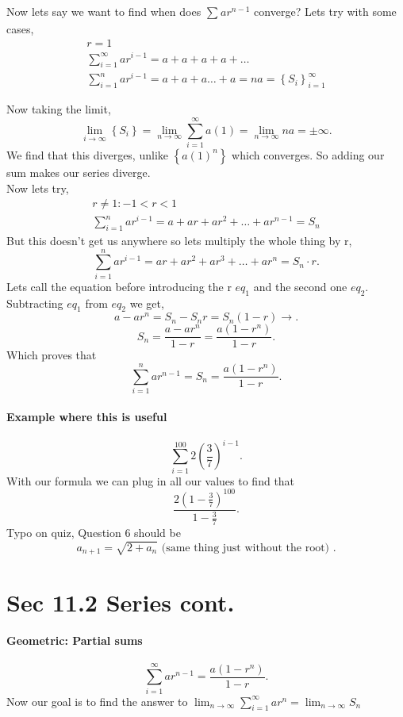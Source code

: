 Now lets say we want to find when does $ \sum_{  } ^{  } ar^{ n-1 } $ converge? Lets try with some cases,
\begin{gather*}
r=1 \\
\sum_{ i=1 } ^{ \infty } ar^{ i-1 } = a + a + a + a + \ldots \\
\sum_{ i=1 } ^{ n } ar^{ i-1 }= a + a + a \ldots + a = na = \left\{ S_{ i } \right\}^{ \infty }_{ i=1 } 
\end{gather*}

Now taking the limit, 
\[
\lim_{ i \to \infty} \left\{ S_{ i } \right\} =\lim_{ n \to \infty} \sum_{ i=1 } ^{ \infty } a\left( 1 \right) = \lim_{ n \to \infty} na = \pm \infty
.\] 
We find that this diverges, unlike $ \left\{ a\left( 1 \right) ^{ n } \right\}  $ which converges. So adding our sum makes our series diverge. \\

Now lets try,
\begin{gather*}
r\neq 1: -1<r<1\\
\sum_{ i=1 } ^{ n } ar^{ i-1 }=a+ar+ar^2+ \ldots + ar^{ n-1 }= S_{ n }
\end{gather*}
But this doesn't get us anywhere so lets multiply the whole thing by r,
\[
\sum_{ i=1 } ^{ n } ar^{ i-1 }= ar + ar^2+ ar^3+ \ldots + ar^{ n }= S_n \cdot r
.\] 
Lets call the equation before introducing the r $ eq_1 $ and the second one $ eq_2 $. Subtracting $ eq_1 $ from $ eq_2 $ we get,
\[
a-ar^{ n } = S_n - S_n r = S_n\left( 1-r \right) \to
.\] 
\[
S_n=\frac{ a-ar^{ n } }{ 1-r } = \frac{ a\left( 1-r^{ n } \right)  }{ 1-r }
.\] 
Which proves that 
\[
\sum_{ i=1 } ^{ n } ar^{ n-1 }=S_n = \frac{ a\left( 1-r^{ n } \right)  }{ 1-r }
.\] 
\paragraph{Example where this is useful}
\[
\sum_{ i=1 } ^{ 100 } 2\left( \frac{ 3 }{ 7 }  \right) ^{ i-1 }
.\] 
With our formula we can plug in all our values to find that
\[
	\frac{ 2\left( 1-\frac{ 3 }{ 7 }  \right)^{ 100 } }{ 1-\frac{ 3 }{ 7 }  }
.\] 	
Typo on quiz, Question 6 should be 
\[
a_{ n+1 }=\sqrt{ 2+a_n} \text{ (same thing just without the root) }
.\] 
\section*{Sec 11.2 Series cont.}%

\paragraph{Geometric: Partial sums}
\[
\sum_{ i=1 } ^{ \infty } ar^{ n-1 }=\frac{ a\left( 1-r^{ n } \right)  }{ 1-r }
.\] 
Now our goal is to find the answer to 
$\lim_{ n \to \infty} \sum_{ i=1 } ^{ \infty } ar^{ n }=\lim_{ n \to \infty} S_n$
